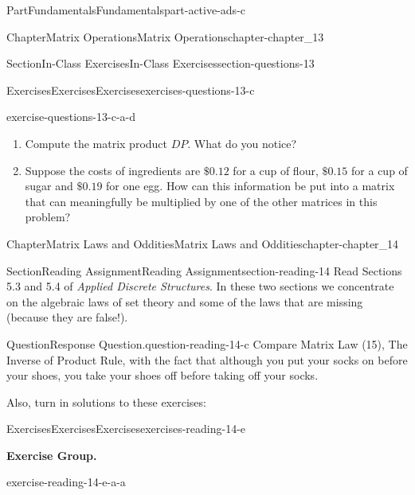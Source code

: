 \documentclass[oneside,10pt,]{book}
\numberwithin{equation}{section}
\begin{document}
\begin{partptx}{Part}{Fundamentals}{}{Fundamentals}{}{}{part-active-ads-c}
\begin{chapterptx}{Chapter}{Matrix Operations}{}{Matrix Operations}{}{}{chapter-chapter_13}
\begin{sectionptx}{Section}{In-Class Exercises}{}{In-Class Exercises}{}{}{section-questions-13}
\begin{exercises-subsection-numberless}{Exercises}{Exercises}{}{Exercises}{}{}{exercises-questions-13-c}
\begin{exercisegroup}
\begin{divisionexerciseeg}{4}{}{}{exercise-questions-13-c-a-d}
\begin{enumerate}[label=(\alph*)]
\item{}Compute the matrix product \(D P\).   What do you notice?%
\item{}Suppose the costs of ingredients are \(\$0.12\) for a cup of flour, \(\$0.15\) for a cup of sugar and \(\$0.19\) for one egg. How can this information be put into a matrix that can meaningfully be multiplied by one of the other matrices in this problem?%
\end{enumerate}
%
\end{divisionexerciseeg}%
\end{exercisegroup}
\par\medskip\noindent
\end{exercises-subsection-numberless}
\end{sectionptx}
\end{chapterptx}
%
\typeout{************************************************}
\typeout{************************************************}
%
\begin{chapterptx}{Chapter}{Matrix Laws and Oddities}{}{Matrix Laws and Oddities}{}{}{chapter-chapter_14}
\renewcommand*{\chaptername}{Chapter}
%
%
\typeout{************************************************}
\typeout{************************************************}
%
\begin{sectionptx}{Section}{Reading Assignment}{}{Reading Assignment}{}{}{section-reading-14}
Read Sections 5.3 and 5.4 of \emph{Applied Discrete Structures}.  In these two sections we concentrate on the algebraic laws of set theory and some of the laws that are missing (because they are false!).%
\begin{question}{Question}{Response Question.}{question-reading-14-c}%
Compare Matrix Law (15), The Inverse of Product Rule, with the fact that although you put your socks on before your shoes, you take your shoes off before taking off your socks.%
\end{question}
Also, turn in solutions to these exercises:%
%
%
\typeout{************************************************}
\typeout{************************************************}
%
\begin{exercises-subsection-numberless}{Exercises}{Exercises}{}{Exercises}{}{}{exercises-reading-14-e}
\par\medskip\noindent%
\textbf{Exercise Group.}\space\space%
\begin{exercisegroup}
\begin{divisionexerciseeg}{1}{}{}{exercise-reading-14-e-a-a}%

\end{divisionexerciseeg}
\end{exercisegroup}
\end{exercises-subsection-numberless}
\end{sectionptx}
\end{chapterptx}
\end{partptx}
\end{document}

